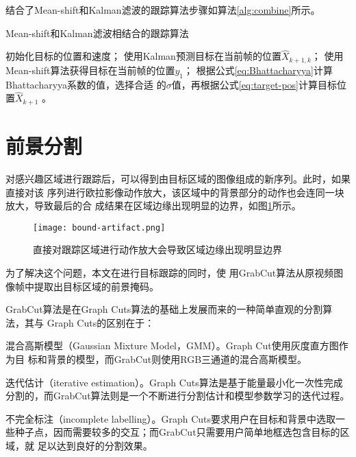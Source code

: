 结合了Mean-shift和Kalman滤波的跟踪算法步骤如算法\ref{alg:combine}所示。

\begin{algorithm}
  \caption{Mean-shift和Kalman滤波相结合的跟踪算法}
  \label{alg:combine}
  \begin{algorithmic}[1]
    \STATE 初始化目标的位置和速度；
    \STATE 使用Kalman预测目标在当前帧的位置$\hat{X}_{k+1,k}$；
    \STATE 使用Mean-shift算法获得目标在当前帧的位置$y_1$；
    \STATE 根据公式\ref{eq:Bhattacharyya}计算Bhattacharyya系数的值，选择合适
    的$\sigma$值，再根据公式\ref{eq:target-pos}计算目标位置$\hat{X}_{k+1}$ 。
  \end{algorithmic}
\end{algorithm}

\section{前景分割}
\label{sec:grabcut}

对感兴趣区域进行跟踪后，可以得到由目标区域的图像组成的新序列。此时，如果直接对该
序列进行欧拉影像动作放大，该区域中的背景部分的动作也会连同一块放大，导致最后的合
成结果在区域边缘出现明显的边界，如图\ref{fig:bound-artifact}所示。

\begin{figure}[htbp]
  \centering
  \texttt{[image: bound-artifact.png]}
  \caption{直接对跟踪区域进行动作放大会导致区域边缘出现明显边界}
  \label{fig:bound-artifact}
\end{figure}

为了解决这个问题，本文在进行目标跟踪的同时，使
用GrabCut算法从原视频图像帧中提取出目标区域的前景掩码。

GrabCut算法是在Graph Cuts算法的基础上发展而来的一种简单直观的分割算法，其与
Graph Cuts的区别在于：

\begin{compactenum}
\item 混合高斯模型（Gaussian Mixture Model，GMM）。Graph Cut使用灰度直方图作为目
  标和背景的模型，而GrabCut则使用RGB三通道的混合高斯模型。
\item 迭代估计（iterative estimation）。Graph Cuts算法是基于能量最小化一次性完成
  分割的，而GrabCut算法则是一个不断进行分割估计和模型参数学习的迭代过程。
\item 不完全标注（incomplete labelling）。Graph Cuts要求用户在目标和背景中选取一
  些种子点，因而需要较多的交互；而GrabCut只需要用户简单地框选包含目标的区域，就
  足以达到良好的分割效果。
\end{compactenum}

